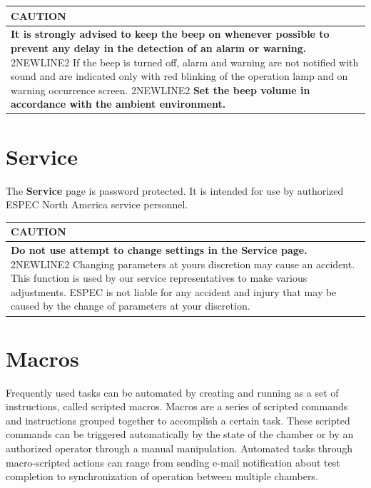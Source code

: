 \begin{longtable}[]{@{}l@{}}
\toprule
\begin{minipage}[b]{0.97\columnwidth}\raggedright
CAUTION\strut
\end{minipage}\tabularnewline
\midrule
\endhead
\begin{minipage}[t]{0.97\columnwidth}\raggedright
\textbf{It is strongly advised to keep the beep on whenever possible to
prevent any delay in the detection of an alarm or warning.} 2NEWLINE2 If
the beep is turned off, alarm and warning are not notified with sound
and are indicated only with red blinking of the operation lamp and on
warning occurrence screen. 2NEWLINE2 \textbf{Set the beep volume in
accordance with the ambient environment.}\strut
\end{minipage}\tabularnewline
\bottomrule
\end{longtable}


\section{Service}

The \textbf{Service} page is password protected. It is intended for use
by authorized ESPEC North America service personnel.

\begin{longtable}[]{@{}l@{}}
\toprule
\begin{minipage}[b]{0.97\columnwidth}\raggedright
CAUTION\strut
\end{minipage}\tabularnewline
\midrule
\endhead
\begin{minipage}[t]{0.97\columnwidth}\raggedright
\textbf{Do not use attempt to change settings in the Service page.}
2NEWLINE2 Changing parameters at yours discretion may cause an accident.
This function is used by our service representatives to make various
adjustments. ESPEC is not liable for any accident and injury that may be
caused by the change of parameters at your discretion.\strut
\end{minipage}\tabularnewline
\bottomrule
\end{longtable}


\section{Macros}

Frequently used tasks can be automated by creating and running as a set
of instructions, called scripted macros. Macros are a series of scripted
commands and instructions grouped together to accomplish a certain task.
These scripted commands can be triggered automatically by the state of
the chamber or by an authorized operator through a manual manipulation.
Automated tasks through macro-scripted actions can range from sending
e-mail notification about test completion to synchronization of
operation between multiple chambers.

